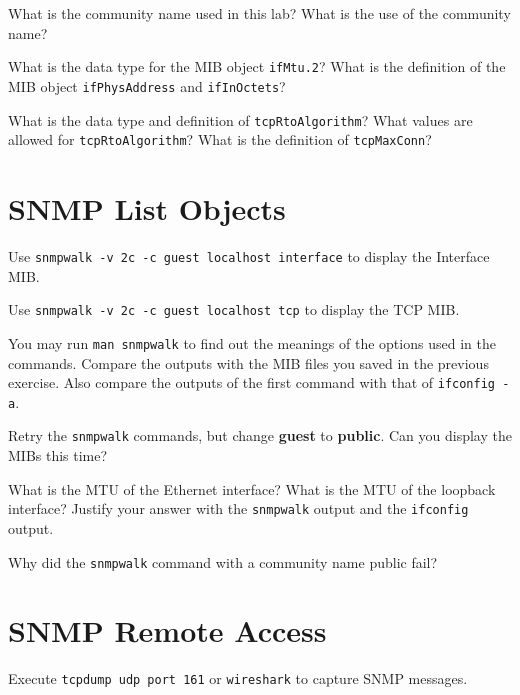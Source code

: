 \documentclass{../UTNetLab}
\begin{document}
    \begin{report}
    \item What is the community name used in this lab? What is the use of the
    community name?
    
    \item What is the data type for the MIB object \texttt{ifMtu.2}? What is the definition of the MIB object \texttt{ifPhysAddress} and \texttt{ifInOctets}?
    
    \item What is the data type and definition of \texttt{tcpRtoAlgorithm}? What values are allowed for \texttt{tcpRtoAlgorithm}? What is the definition of \texttt{tcpMaxConn}?
    \end{report}

\section{SNMP List Objects}
    Use \lstinline[emph=guest]{snmpwalk -v 2c -c guest localhost interface} to display the Interface MIB.

    Use \lstinline[emph=guest]{snmpwalk -v 2c -c guest localhost tcp} to display the TCP MIB.

    You may run \lstinline{man snmpwalk} to find out the meanings of the options used in the commands. Compare the outputs with the MIB files you saved in the previous exercise. Also compare the outputs of the first command with that of \lstinline{ifconfig -a}.

    Retry the \lstinline{snmpwalk} commands, but change \textbf{guest} to \textbf{public}. Can you display the MIBs this time?
    
    \begin{report}
    \item What is the MTU of the Ethernet interface? What is the MTU of the loopback interface? Justify your answer with the \lstinline{snmpwalk} output and the \lstinline{ifconfig} output.
    
    \item Why did the \lstinline{snmpwalk} command with a community name public fail?
    \end{report}

\section{SNMP Remote Access}
    Execute \lstinline{tcpdump udp port 161} or \lstinline{wireshark} to capture SNMP messages.
\end{document}
